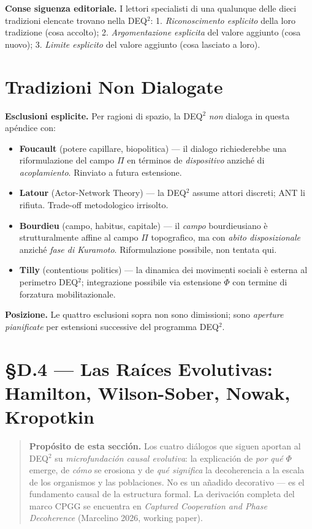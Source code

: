 \Proved{} \textbf{Conse siguenza editoriale.} I lettori specialisti di una
qualunque delle dieci tradizioni elencate trovano nella DEQ$^2$: 1.
\emph{Riconoscimento esplicito} della loro tradizione (cosa accolto); 2.
\emph{Argomentazione esplicita} del valore aggiunto (cosa nuovo); 3.
\emph{Limite esplicito} del valore aggiunto (cosa lasciato a loro).



\section{Tradizioni Non Dialogate}\label{tradizioni-non-dialogate}

\Conj{} \textbf{Esclusioni esplicite.} Per ragioni di spazio, la DEQ$^2$
\emph{non} dialoga in questa apéndice con:

\begin{itemize}
\tightlist
\item
  \textbf{Foucault} (potere capillare, biopolitica) --- il dialogo
  richiederebbe una riformulazione del campo \(\Pi\) en términos de
  \emph{dispositivo} anziché di \emph{acoplamiento}. Rinviato a futura
  estensione.
\item
  \textbf{Latour} (Actor-Network Theory) --- la DEQ$^2$ assume attori
  discreti; ANT li rifiuta. Trade-off metodologico irrisolto.
\item
  \textbf{Bourdieu} (campo, habitus, capitale) --- il \emph{campo}
  bourdieusiano è strutturalmente affine al campo \(\Pi\) topografico,
  ma con \emph{abito disposizionale} anziché \emph{fase di Kuramoto}.
  Riformulazione possibile, non tentata qui.
\item
  \textbf{Tilly} (contentious politics) --- la dinamica dei movimenti
  sociali è esterna al perimetro DEQ$^2$; integrazione possibile via
  estensione \(\dot\Phi\) con termine di forzatura mobilitazionale.
\end{itemize}

\Proved{} \textbf{Posizione.} Le quattro esclusioni sopra non sono
dimissioni; sono \emph{aperture pianificate} per estensioni successive
del programma DEQ$^2$.



\section{§D.4 --- Las Ra\'{i}ces Evolutivas: Hamilton, Wilson-Sober, Nowak, Kropotkin}\label{d4-radici-evolutive}

\begin{quote}
\textbf{Prop\'{o}sito de esta secci\'{o}n.} Los cuatro di\'{a}logos que
siguen aportan al DEQ$^2$ su \emph{microfundaci\'{o}n causal evolutiva}:
la explicaci\'{o}n de \emph{por qu\'{e}} $\Phi$ emerge, de \emph{c\'{o}mo}
se erosiona y de \emph{qu\'{e} significa} la decoherencia a la escala de
los organismos y las poblaciones. No es un a\~{n}adido decorativo ---
es el fundamento causal de la estructura formal. La derivaci\'{o}n
completa del marco CPGG se encuentra en \emph{Captured Cooperation and
Phase Decoherence} (Marcelino 2026, working paper).
\end{quote}

